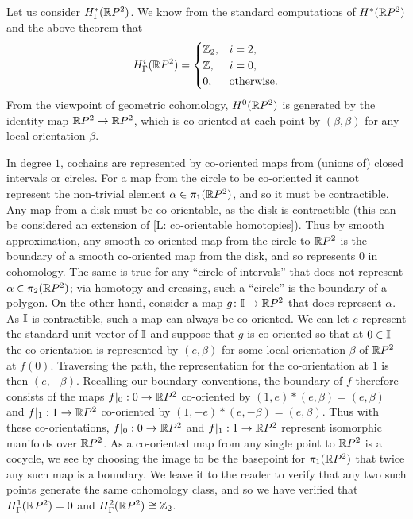 \begin{example}
	Let us consider $H^*_\Gamma(\mathbb{R} P^2)$. We know from the standard computations of $H^*(\mathbb{R} P^2)$ and the above theorem that
	\begin{equation*}
		H_\Gamma^i(\mathbb{R} P^2) =
		\begin{cases}
			\mathbb{Z}_2,&i = 2,\\
			\mathbb{Z},&i = 0,\\
			0,&\text{otherwise.}
		\end{cases}
	\end{equation*}
	From the viewpoint of geometric cohomology, $H^0(\mathbb{R} P^2)$ is generated by the identity map $\mathbb{R} P^2 \to \mathbb{R} P^2$, which is co-oriented at each point by $(\beta,\beta)$ for any local orientation $\beta$.

	In degree $1$, cochains are represented by co-oriented maps from (unions of) closed intervals or circles. For a map from the circle to be co-oriented it cannot represent the non-trivial element $\alpha \in \pi_1(\mathbb{R} P^2)$, and so it must be contractible. Any map from a disk must be co-orientable, as the disk is contractible (this can be considered an extension of \cref{L: co-orientable homotopies}). Thus by smooth approximation, any smooth co-oriented map from the circle to $\mathbb{R} P^2$ is the boundary of a smooth co-oriented map from the disk, and so represents $0$ in cohomology. The same is true for any ``circle of intervals'' that does not represent $\alpha \in \pi_2(\mathbb{R} P^2)$; via homotopy and creasing, such a ``circle'' is the boundary of a polygon. On the other hand, consider a map $g \colon \mathbb{I} \to \mathbb{R} P^2$ that does represent $\alpha$. As $\mathbb{I}$ is contractible, such a map can always be co-oriented. We can let $e$ represent the standard unit vector of $\mathbb{I}$ and suppose that $g$ is co-oriented so that at $0 \in \mathbb{I}$ the co-orientation is represented by $(e,\beta)$ for some local orientation $\beta$ of $\mathbb{R} P^2$ at $f(0)$. Traversing the path, the representation for the co-orientation at $1$ is then $(e,-\beta)$. Recalling our boundary conventions, the boundary of $f$ therefore consists of the maps $f|_0:0 \to \mathbb{R} P^2$ co-oriented by $(1,e)*(e,\beta) = (e,\beta)$ and $f|_1:1 \to \mathbb{R} P^2$ co-oriented by $(1,-e)*(e,-\beta) = (e,\beta)$. Thus with these co-orientations, $f|_0:0 \to \mathbb{R} P^2$ and $f|_1:1 \to \mathbb{R} P^2$ represent isomorphic manifolds over $\mathbb{R} P^2$. As a co-oriented map from any single point to $\mathbb{R} P^2$ is a cocycle, we see by choosing the image to be the basepoint for $\pi_1(\mathbb{R} P^2)$ that twice any such map is a boundary. We leave it to the reader to verify that any two such points generate the same cohomology class, and so we have verified that $H^1_\Gamma(\mathbb{R} P^2) = 0$ and $H_\Gamma^2(\mathbb{R} P^2) \cong \mathbb{Z}_2$.
\end{example}

